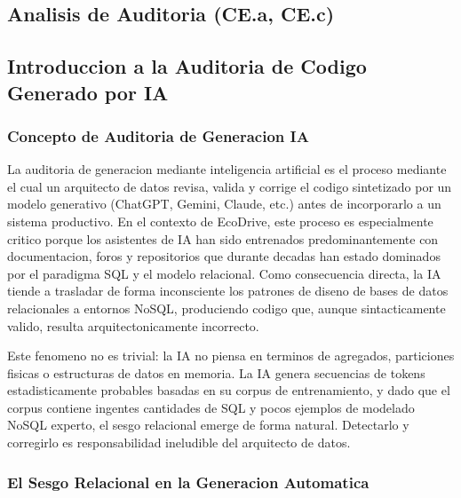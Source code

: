 
\subsection{Analisis de Auditoria (CE.a, CE.c)}

\subsection{Introduccion a la Auditoria de Codigo Generado por IA}

\subsubsection{Concepto de Auditoria de Generacion IA}

La auditoria de generacion mediante inteligencia artificial es el proceso mediante el cual un arquitecto de datos revisa, valida y corrige el codigo sintetizado por un modelo generativo (ChatGPT, Gemini, Claude, etc.) antes de incorporarlo a un sistema productivo. En el contexto de EcoDrive, este proceso es especialmente critico porque los asistentes de IA han sido entrenados predominantemente con documentacion, foros y repositorios que durante decadas han estado dominados por el paradigma SQL y el modelo relacional. Como consecuencia directa, la IA tiende a trasladar de forma inconsciente los patrones de diseno de bases de datos relacionales a entornos NoSQL, produciendo codigo que, aunque sintacticamente valido, resulta arquitectonicamente incorrecto.

Este fenomeno no es trivial: la IA no piensa en terminos de agregados, particiones fisicas o estructuras de datos en memoria. La IA genera secuencias de tokens estadisticamente probables basadas en su corpus de entrenamiento, y dado que el corpus contiene ingentes cantidades de SQL y pocos ejemplos de modelado NoSQL experto, el sesgo relacional emerge de forma natural. Detectarlo y corregirlo es responsabilidad ineludible del arquitecto de datos.

\subsubsection{El Sesgo Relacional en la Generacion Automatica}

